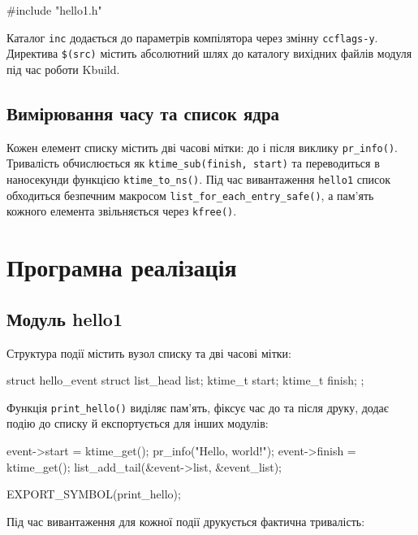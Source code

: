 \documentclass[12pt,a4paper]{article}
\begin{document}
\begin{code}
#include "hello1.h"
\end{code}

Каталог \texttt{inc} додається до параметрів компілятора через змінну
\texttt{ccflags-y}. Директива \texttt{\$(src)} містить абсолютний шлях до
каталогу вихідних файлів модуля під час роботи Kbuild.


\subsection{Вимірювання часу та список ядра}

Кожен елемент списку містить дві часові мітки: до і після виклику
\texttt{pr\_info()}. Тривалість обчислюється як
\texttt{ktime\_sub(finish, start)} та переводиться в наносекунди функцією
\texttt{ktime\_to\_ns()}. Під час вивантаження \texttt{hello1} список
обходиться безпечним макросом \texttt{list\_for\_each\_entry\_safe()}, а
пам'ять кожного елемента звільняється через \texttt{kfree()}.

\section{Програмна реалізація}

\subsection{Модуль hello1}

Структура події містить вузол списку та дві часові мітки:

\begin{code}
struct hello_event {
    struct list_head list;
    ktime_t start;
    ktime_t finish;
};
\end{code}

Функція \texttt{print\_hello()} виділяє пам'ять, фіксує час до та після
друку, додає подію до списку й експортується для інших модулів:

\begin{code}
event->start = ktime_get();
pr_info("Hello, world!\n");
event->finish = ktime_get();
list_add_tail(&event->list, &event_list);

EXPORT_SYMBOL(print_hello);
\end{code}

Під час вивантаження для кожної події друкується фактична тривалість:
\end{document}

